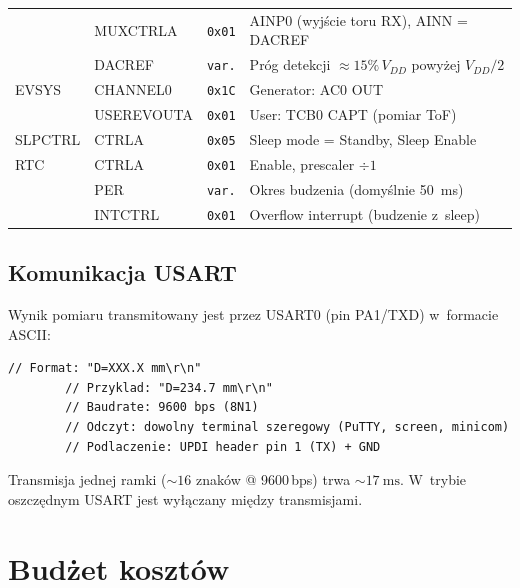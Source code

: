 \documentclass[a4paper,11pt]{article}
\begin{document}
\begin{table}[H]
\begin{tabularx}{\textwidth}{l l l X}
			& MUXCTRLA    & \texttt{0x01}  & AINP0 (wyjście toru RX), AINN = DACREF \\
			& DACREF      & \texttt{var.}  & Próg detekcji $\approx 15\%\,V_{DD}$ powyżej $V_{DD}/2$ \\
			\midrule
			EVSYS   & CHANNEL0    & \texttt{0x1C}  & Generator: AC0 OUT \\
			& USEREVOUTA  & \texttt{0x01}  & User: TCB0 CAPT (pomiar ToF) \\
			\midrule
			SLPCTRL & CTRLA       & \texttt{0x05}  & Sleep mode = Standby, Sleep Enable \\
			\midrule
			RTC     & CTRLA       & \texttt{0x01}  & Enable, prescaler $\div 1$ \\
			& PER         & \texttt{var.}  & Okres budzenia (domyślnie \SI{50}{\milli\second}) \\
			& INTCTRL     & \texttt{0x01}  & Overflow interrupt (budzenie z~sleep) \\
			\bottomrule
		\end{tabularx}
	\end{table}
	
	\subsection{Komunikacja USART}
	\label{sec:usart}
	
	Wynik pomiaru transmitowany jest przez USART0 (pin PA1/TXD) w~formacie ASCII:
	
	\begin{lstlisting}[caption={Format ramki wyjściowej USART}, label={lst:uart_frame}]
		// Format: "D=XXX.X mm\r\n"
		// Przyklad: "D=234.7 mm\r\n"
		// Baudrate: 9600 bps (8N1)
		// Odczyt: dowolny terminal szeregowy (PuTTY, screen, minicom)
		// Podlaczenie: UPDI header pin 1 (TX) + GND
	\end{lstlisting}
	
	Transmisja jednej ramki (${\sim}16$ znaków @ 9600\,bps) trwa ${\sim}\SI{17}{\milli\second}$.
	W~trybie oszczędnym USART jest wyłączany między transmisjami.
	
	
	\section{Budżet kosztów}
	\label{sec:koszty}
	
\end{document}

